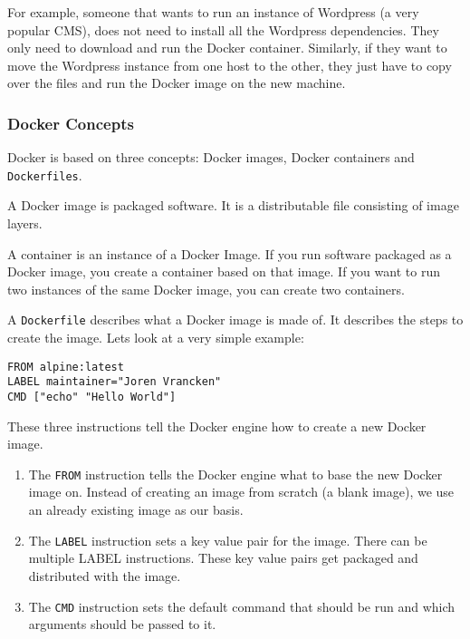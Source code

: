 For example, someone that wants to run an instance of Wordpress (a very popular CMS), does not need to install all the Wordpress dependencies. They only need to download and run the Docker container.
Similarly, if they want to move the Wordpress instance from one host to the other, they just have to copy over the files and run the Docker image on the new machine.

\subsubsection{Docker Concepts}
Docker is based on three concepts: Docker images, Docker containers and \verb|Dockerfiles|.

\hfill

A Docker image is packaged software. It is a distributable file consisting of image layers.

\hfill

A container is an instance of a Docker Image. If you run software packaged as a Docker image, you create a container based on that image. If you want to run two instances of the same Docker image, you can create two containers.

\hfill

A \verb|Dockerfile| describes what a Docker image is made of. It describes the steps to create the image. Lets look at a very simple example:
\begin{lstlisting}
FROM alpine:latest
LABEL maintainer="Joren Vrancken"
CMD ["echo" "Hello World"]
\end{lstlisting}

These three instructions tell the Docker engine how to create a new Docker image.

\begin{enumerate}
    \item The \lstinline{FROM} instruction tells the Docker engine what to base the new Docker image on. Instead of creating an image from scratch (a blank image), we use an already existing image as our basis.

    \item The \lstinline{LABEL} instruction sets a key value pair for the image. There can be multiple LABEL instructions. These key value pairs get packaged and distributed with the image.

    \item The \lstinline{CMD} instruction sets the default command that should be run and which arguments should be passed to it.
\end{enumerate}

